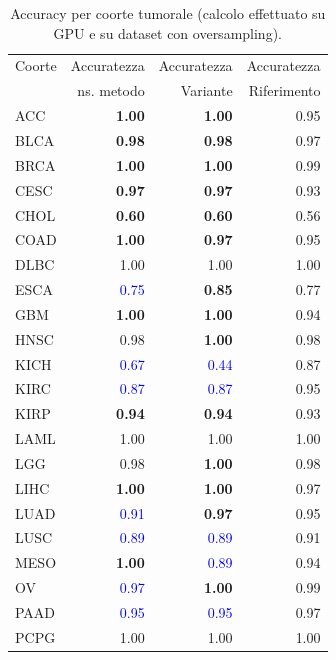 \begin{table}[h!]
    \centering 
    \caption{Accuracy per coorte tumorale (calcolo effettuato su GPU e su dataset con oversampling).}
    \large{
    \begin{tabular}{lrrr}
    \toprule
     Coorte  & Accuratezza & Accuratezza & Accuratezza \\
             & ns. metodo  & Variante    & Riferimento \\
    \midrule
     ACC  & \textbf{1.00} & \textbf{1.00} & 0.95 \\
     BLCA &  \textbf{0.98} & \textbf{0.98} & 0.97 \\
     BRCA &  \textbf{1.00} &\textbf{ 1.00} & 0.99 \\
     CESC &  \textbf{0.97} & \textbf{0.97} & 0.93 \\
     CHOL &  \textbf{0.60} & \textbf{0.60} & 0.56 \\
     COAD &  \textbf{1.00} & \textbf{0.97} & 0.95 \\
     DLBC &  1.00 & 1.00 & 1.00 \\
     ESCA &  \textcolor{blue}{0.75} & \textbf{0.85} & 0.77 \\
     GBM  &  \textbf{1.00} & \textbf{1.00} & 0.94 \\
     HNSC &  0.98 & \textbf{1.00} & 0.98 \\
     KICH &  \textcolor{blue}{0.67} & \textcolor{blue}{0.44} & 0.87 \\
     KIRC &  \textcolor{blue}{0.87} & \textcolor{blue}{0.87} & 0.95 \\
     KIRP &  \textbf{0.94} & \textbf{0.94} & 0.93 \\
     LAML &  1.00 & 1.00 & 1.00 \\
     LGG  &  0.98 & \textbf{1.00} & 0.98 \\
     LIHC &  \textbf{1.00} & \textbf{1.00} & 0.97 \\
     LUAD &  \textcolor{blue}{0.91} & \textbf{0.97} & 0.95 \\
     LUSC &  \textcolor{blue}{0.89} & \textcolor{blue}{0.89} & 0.91 \\
     MESO &  \textbf{1.00} & \textcolor{blue}{0.89} & 0.94 \\
     OV   &  \textcolor{blue}{0.97} & \textbf{1.00} & 0.99 \\
     PAAD &  \textcolor{blue}{0.95} & \textcolor{blue}{0.95} & 0.97 \\
     PCPG &  1.00 & 1.00 & 1.00 \\

\end{tabular}}
\end{table}
